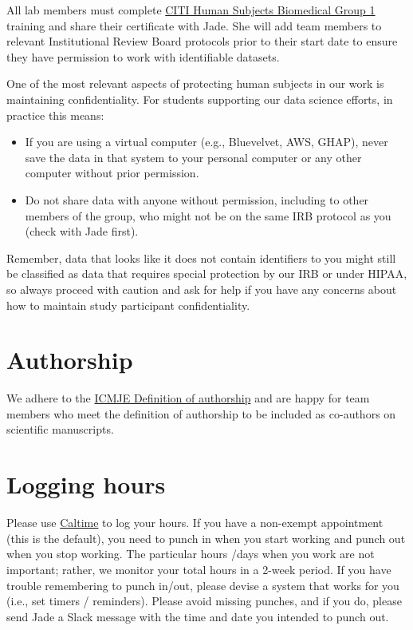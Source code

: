 \documentclass[]{book}
\providecommand{\tightlist}{%
  \setlength{\itemsep}{0pt}\setlength{\parskip}{0pt}}
\begin{document}
All lab members must complete \href{https://cphs.berkeley.edu/quickguideCITItraining.pdf}{CITI Human Subjects Biomedical Group 1} training and share their certificate with Jade. She will add team members to relevant Institutional Review Board protocols prior to their start date to ensure they have permission to work with identifiable datasets.

One of the most relevant aspects of protecting human subjects in our work is maintaining confidentiality. For students supporting our data science efforts, in practice this means:

\begin{itemize}
\tightlist
\item
  If you are using a virtual computer (e.g., Bluevelvet, AWS, GHAP), never save the data in that system to your personal computer or any other computer without prior permission.
\item
  Do not share data with anyone without permission, including to other members of the group, who might not be on the same IRB protocol as you (check with Jade first).
\end{itemize}

Remember, data that looks like it does not contain identifiers to you might still be classified as data that requires special protection by our IRB or under HIPAA, so always proceed with caution and ask for help if you have any concerns about how to maintain study participant confidentiality.

\hypertarget{authorship}{%
\section{Authorship}\label{authorship}}

We adhere to the \href{http://www.icmje.org/recommendations/browse/roles-and-responsibilities/defining-the-role-of-authors-and-contributors.html}{ICMJE Definition of authorship} and are happy for team members who meet the definition of authorship to be included as co-authors on scientific manuscripts.

\hypertarget{logging-hours}{%
\section{Logging hours}\label{logging-hours}}

Please use \href{caltime.berkeley.edu}{Caltime} to log your hours. If you have a non-exempt appointment (this is the default), you need to punch in when you start working and punch out when you stop working. The particular hours /days when you work are not important; rather, we monitor your total hours in a 2-week period. If you have trouble remembering to punch in/out, please devise a system that works for you (i.e., set timers / reminders). Please avoid missing punches, and if you do, please send Jade a Slack message with the time and date you intended to punch out.
\end{document}

